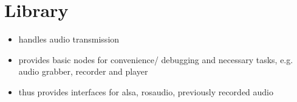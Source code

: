 


\chapter{Library}

\begin{itemize}
	\item handles audio transmission
	\item provides basic nodes for convenience/ debugging and necessary tasks, e.g. audio grabber, recorder and player
	\item thus provides interfaces for alsa, rosaudio, previously recorded audio
\end{itemize}